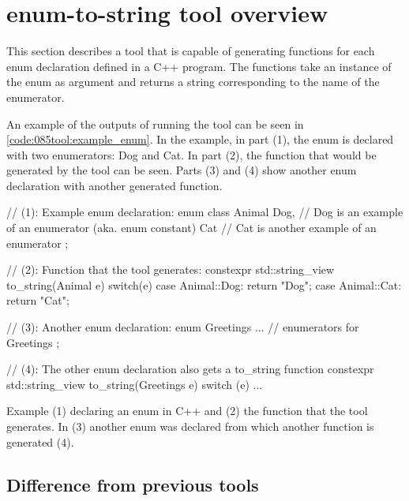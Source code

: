 \pagebreak
\section{enum-to-string tool overview}
This section describes a tool that is capable of generating  functions for each enum declaration defined in a C++ program. The  functions take an instance of the enum as argument and returns a string corresponding to the name of the enumerator.

An example of the outputs of running the tool can be seen in \cref{code:085tool:example_enum}. In the example, in part (1), the enum  is declared with two enumerators: Dog and Cat. In part (2), the  function that would be generated by the tool can be seen. Parts (3) and (4) show another enum declaration with another generated  function.

\begin{listing}[H]
    \begin{cppcode}
// (1): Example enum declaration:
enum class Animal{
    Dog, // Dog is an example of an enumerator (aka. enum constant)
    Cat // Cat is another example of an enumerator
};


// (2): Function that the tool generates:
constexpr std::string_view to_string(Animal e){
    switch(e) {
        case Animal::Dog: return "Dog";
        case Animal::Cat: return "Cat";
    }
}

// (3): Another enum declaration:
enum Greetings {
    ... // enumerators for Greetings
};

// (4): The other enum declaration also gets a to_string function
constexpr std::string_view to_string(Greetings e){
    switch (e) {
        ... 
    }
}
    \end{cppcode}
    \caption{Example (1) declaring an enum in C++ and (2) the  function that the tool generates. In (3) another enum was declared from which another  function is generated (4).}
    \label{code:085tool:example_enum}
\end{listing}

\subsection{Difference from previous tools}

